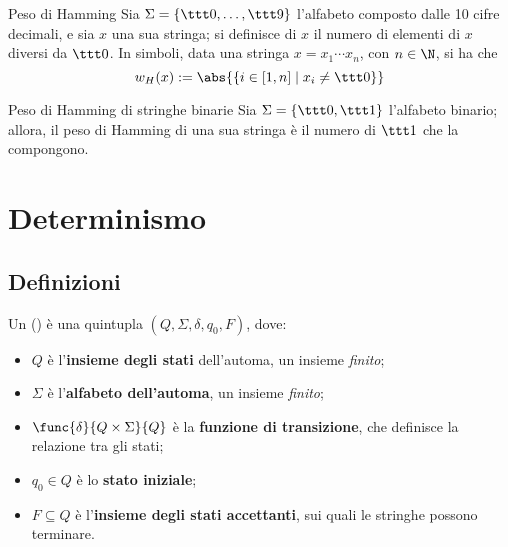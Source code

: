 \documentclass[a4paper, 12pt]{report}
\begin{document}
    \begin{frameddefn}{Peso di Hamming}
        Sia $\Sigma = \{\ttt 0, \ldots,  \ttt 9\}$ l'alfabeto composto dalle 10 cifre decimali, e sia $x$ una sua stringa; si definisce  di $x$ il numero di elementi di $x$ diversi da $\ttt 0$. In simboli, data una stringa $x = x_1 \cdots x_n$, con $n \in \N$, si ha che $$w_H(x) := \abs{\{i \in [1, n] \mid x_i \neq \ttt 0\}}$$
    \end{frameddefn}

    \begin{framedobs}{Peso di Hamming di stringhe binarie}
        Sia $\Sigma = \{ \ttt 0, \ttt 1 \}$ l'alfabeto binario; allora, il peso di Hamming di una sua stringa è il numero di $\ttt 1$ che la compongono.
    \end{framedobs}

    \section{Determinismo}

    \subsection{Definizioni}

    \begin{frameddefn}{\DFA}
        Un \textbf{\DFA} () è una quintupla $(Q, \Sigma, \delta, q_0, F)$, dove:

        \begin{itemize}
            \item $Q$ è l'\textbf{insieme degli stati} dell'automa, un insieme \textit{finito};
            \item $\Sigma$ è l'\textbf{alfabeto dell'automa}, un insieme \textit{finito};
            \item $\func{\delta}{Q \times \Sigma}{Q}$ è la \textbf{funzione di transizione}, che definisce la relazione tra gli stati;
            \item $q_0 \in Q$ è lo \textbf{stato iniziale};
            \item $F \subseteq Q$ è l'\textbf{insieme degli stati accettanti}, sui quali le stringhe possono terminare.
        \end{itemize}

    \end{frameddefn}
\end{document}
